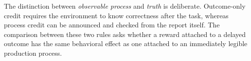 The distinction between \emph{observable process} and \emph{truth} is deliberate. Outcome-only credit requires the environment to know correctness after the task, whereas process credit can be announced and checked from the report itself. The comparison between these two rules asks whether a reward attached to a delayed outcome has the same behavioral effect as one attached to an immediately legible production process.
